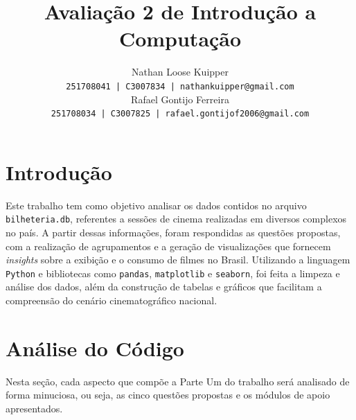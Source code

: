 \documentclass{article}
\title{Avaliação 2 de Introdução a Computação}
\author{Nathan Loose Kuipper \\ \small{\texttt{251708041 | C3007834 | nathankuipper@gmail.com}} \\ Rafael Gontijo Ferreira \\ \small{\texttt{251708034 | C3007825 | rafael.gontijof2006@gmail.com}} }
\begin{document}
\maketitle

\begin{abstract}

\lipsum[1-2]  %
\end{abstract}
\pagebreak
\section{Introdução}
Este trabalho tem como objetivo analisar os dados contidos no arquivo \texttt{bilheteria.db}, referentes a sessões de cinema realizadas em diversos complexos no país. A partir dessas informações, foram respondidas as questões propostas, com a realização de agrupamentos e a geração de visualizações que fornecem \textit{insights} sobre a exibição e o consumo de filmes no Brasil. Utilizando a linguagem \texttt{Python} e bibliotecas como \texttt{pandas}, \texttt{matplotlib} e \texttt{seaborn}, foi feita a limpeza e análise dos dados, além da construção de tabelas e gráficos que facilitam a compreensão do cenário cinematográfico nacional.

\section{Análise do Código}
Nesta seção, cada aspecto que compõe a Parte Um do trabalho será analisado de forma minuciosa, ou seja, as cinco questões propostas e os módulos de apoio apresentados.
\end{document}
